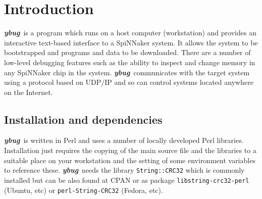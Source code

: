 %
%
%

\def\FullTitle{\textsl{ybug} - System Control Tool for SpiNNaker}
\def\ShortTitle{ybug 2.0.0}
\def\Date{8 Mar 2016}
\def\Version{2.0.0}
\def\Author{Steve Temple}
\def\Email{steven.temple@manchester.ac.uk}



\newcommand{\ybug}{\textbf{\textsl{ybug}}}

\section{Introduction}

\ybug\ is a program which runs on a host computer (workstation) and
provides an interactive text-based interface to a SpiNNaker system.
It allows the system to be bootstrapped and programs and data to be
downloaded. There are a number of low-level debugging features such as
the ability to inspect and change memory in any SpiNNaker chip in the
system. \ybug\ communicates with the target system using a protocol
based on UDP/IP and so can control systems located anywhere on the
Internet.

\subsection{Installation and dependencies}

\ybug\ is written in Perl and uses a number of locally developed Perl
libraries. Installation just requires the copying of the main source
file and the libraries to a suitable place on your workstation and the
setting of some environment variables to reference these. \ybug\ needs
the library \texttt{String::CRC32} which is commonly installed but
can be also found at CPAN or as package \texttt{libstring-crc32-perl}
(Ubuntu, etc) or \texttt{perl-String-CRC32} (Fedora, etc).

